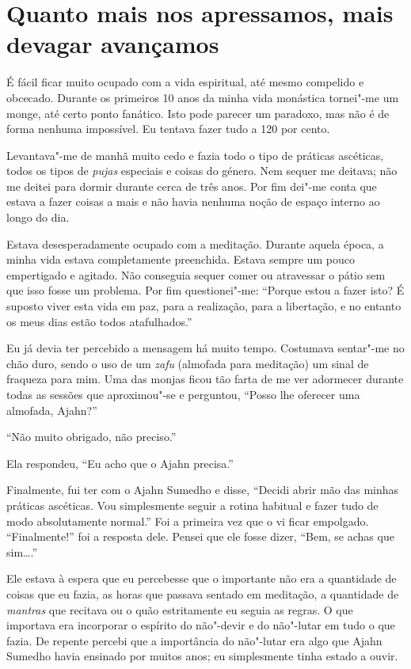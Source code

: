 \section{Quanto mais nos apressamos, mais devagar avançamos}

É fácil ficar muito ocupado com a vida espiritual, até mesmo compelido e
obcecado. Durante os primeiros 10 anos da minha vida monástica tornei"-me
um monge, até certo ponto fanático. Isto pode parecer um paradoxo, mas
não é de forma nenhuma impossível. Eu tentava fazer tudo a 120 por
cento.

Levantava"-me de manhã muito cedo e fazia todo o tipo de práticas
ascéticas, todos os tipos de \emph{pujas} especiais e coisas do género.
Nem sequer me deitava; não me deitei para dormir durante cerca de três
anos. Por fim dei"-me conta que estava a fazer coisas a mais e não havia
nenhuma noção de espaço interno ao longo do dia.

Estava desesperadamente ocupado com a meditação. Durante aquela época, a
minha vida estava completamente preenchida. Estava sempre um pouco
empertigado e agitado. Não conseguia sequer comer ou atravessar o pátio
sem que isso fosse um problema. Por fim questionei"-me: ``Porque estou a
fazer isto? É suposto viver esta vida em paz, para a realização, para a
libertação, e no entanto os meus dias estão todos atafulhados.''

Eu já devia ter percebido a mensagem há muito tempo. Costumava sentar"-me
no chão duro, sendo o uso de um \emph{zafu} (almofada para meditação) um
sinal de fraqueza para mim. Uma das monjas ficou tão farta de me ver
adormecer durante todas as sessões que aproximou"-se e perguntou, ``Posso
lhe oferecer uma almofada, Ajahn?''

``Não muito obrigado, não preciso.''

Ela respondeu, ``Eu acho que o Ajahn precisa.''

Finalmente, fui ter com o Ajahn Sumedho e disse, ``Decidi abrir mão das
minhas práticas ascéticas. Vou simplesmente seguir a rotina habitual e
fazer tudo de modo absolutamente normal.'' Foi a primeira vez que o vi
ficar empolgado. ``Finalmente!'' foi a resposta dele. Pensei que ele
fosse dizer, ``Bem, se achas que sim\ldots{}.''

Ele estava à espera que eu percebesse que o importante não era a
quantidade de coisas que eu fazia, as horas que passava sentado em
meditação, a quantidade de \emph{mantras} que recitava ou o quão
estritamente eu seguia as regras. O que importava era incorporar o
espírito do não"-devir e do não"-lutar em tudo o que fazia. De repente
percebi que a importância do não"-lutar era algo que Ajahn Sumedho havia
ensinado por muitos anos; eu simplesmente tinha estado a ouvir.

